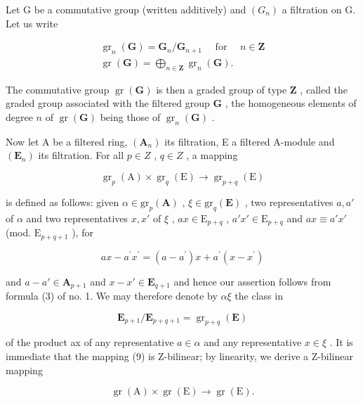 Let G be a commutative group (written additively) and \((G_{n})\) a filtration on G. Let us write

\[
\begin{array}{l} \operatorname{gr} _ {n} (\mathbf {G}) = \mathbf {G} _ {n} / \mathbf {G} _ {n + 1} \quad \text { for } \quad n \in \mathbf {Z} \\ \operatorname{gr} (\mathbf {G}) = \bigoplus_ {n \in \mathbf {Z}} \operatorname{gr} _ {n} (\mathbf {G}). \end{array}\tag{8}
\]

The commutative group \(\operatorname{gr}(\mathbf{G})\) is then a graded group of type \(\mathbf{Z}\) , called the graded group associated with the filtered group \(\mathbf{G}\) , the homogeneous elements of degree \(n\) of \(\operatorname{gr}(\mathbf{G})\) being those of \(\operatorname{gr}_n(\mathbf{G})\) .

Now let A be a filtered ring, \((\mathbf{A}_{n})\) its filtration, E a filtered A-module and \((\mathbf{E}_{n})\) its filtration. For all \(p \in Z\) , \(q \in Z\) , a mapping

\[
\operatorname{gr} _ {p} (\mathrm{A}) \times \operatorname{gr} _ {q} (\mathrm{E}) \rightarrow \operatorname{gr} _ {p + q} (\mathrm{E})\tag{9}
\]

is defined as follows: given \(\alpha \in \mathrm{gr}_p(\mathbf{A})\) , \(\xi \in \mathrm{gr}_q(\mathbf{E})\) , two representatives \(a, a'\) of \(\alpha\) and two representatives \(x, x'\) of \(\xi\) , \(ax \in \mathrm{E}_{p + q}\) , \(a'x' \in \mathrm{E}_{p + q}\) and \(ax \equiv a'x'\) (mod. \(\mathrm{E}_{p + q + 1}\) ), for

\[
a x - a ^ {\prime} x ^ {\prime} = (a - a ^ {\prime}) x + a ^ {\prime} (x - x ^ {\prime})
\]

and \(a - a' \in \mathbf{A}_{p+1}\) and \(x - x' \in \mathbf{E}_{q+1}\) and hence our assertion follows from formula (3) of no. 1. We may therefore denote by \(\alpha\xi\) the class in

\[
\mathbf {E} _ {p + 1} / \mathbf {E} _ {p + q + 1} = \operatorname{gr} _ {p + q} (\mathbf {E})
\]

of the product ax of any representative \(a \in \alpha\) and any representative \(x \in \xi\) . It is immediate that the mapping (9) is Z-bilinear; by linearity, we derive a Z-bilinear mapping

\[
\operatorname{gr} (\mathrm{A}) \times \operatorname{gr} (\mathrm{E}) \rightarrow \operatorname{gr} (\mathrm{E}).\tag{10}
\]


